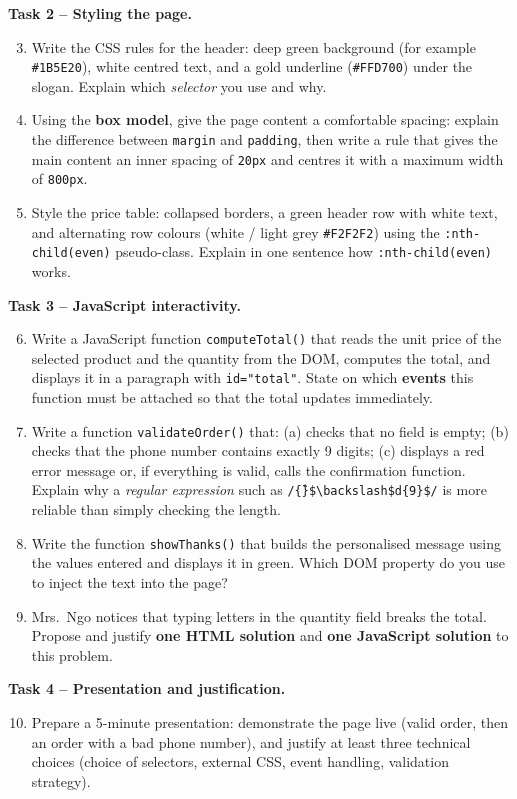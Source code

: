 \documentclass[11pt]{article}
\begin{document}
\textbf{Task 2 -- Styling the page.}
\begin{enumerate}
\setcounter{enumi}{2}
\item Write the CSS rules for the header: deep green background (for example \texttt{\#1B5E20}), white centred text, and a gold underline (\texttt{\#FFD700}) under the slogan. Explain which \emph{selector} you use and why.
\item Using the \textbf{box model}, give the page content a comfortable spacing: explain the difference between \texttt{margin} and \texttt{padding}, then write a rule that gives the main content an inner spacing of \texttt{20px} and centres it with a maximum width of \texttt{800px}.
\item Style the price table: collapsed borders, a green header row with white text, and alternating row colours (white / light grey \texttt{\#F2F2F2}) using the \texttt{:nth-child(even)} pseudo-class. Explain in one sentence how \texttt{:nth-child(even)} works.
\end{enumerate}

\textbf{Task 3 -- JavaScript interactivity.}
\begin{enumerate}
\setcounter{enumi}{5}
\item Write a JavaScript function \texttt{computeTotal()} that reads the unit price of the selected product and the quantity from the DOM, computes the total, and displays it in a paragraph with \texttt{id="total"}. State on which \textbf{events} this function must be attached so that the total updates immediately.
\item Write a function \texttt{validateOrder()} that: (a) checks that no field is empty; (b) checks that the phone number contains exactly 9 digits; (c) displays a red error message or, if everything is valid, calls the confirmation function. Explain why a \emph{regular expression} such as \texttt{/\^\{\}\$\textbackslash{}backslash\$d\{9\}\$/} is more reliable than simply checking the length.
\item Write the function \texttt{showThanks()} that builds the personalised message using the values entered and displays it in green. Which DOM property do you use to inject the text into the page?
\item Mrs.\ Ngo notices that typing letters in the quantity field breaks the total. Propose and justify \textbf{one HTML solution} and \textbf{one JavaScript solution} to this problem.
\end{enumerate}

\textbf{Task 4 -- Presentation and justification.}
\begin{enumerate}
\setcounter{enumi}{9}
\item Prepare a 5-minute presentation: demonstrate the page live (valid order, then an order with a bad phone number), and justify at least three technical choices (choice of selectors, external CSS, event handling, validation strategy).
\end{enumerate}
\end{document}
